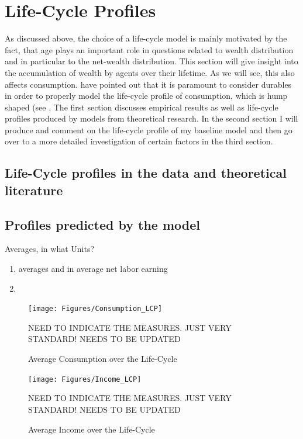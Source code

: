 \documentclass[a4paper,12pt]{article}
\begin{document}
\section{Life-Cycle Profiles}
As discussed above, the choice of a life-cycle model is mainly motivated by the fact, that age plays an important role in questions related to wealth distribution and in particular to the net-wealth distribution. This section will give insight into the accumulation of wealth by agents over their lifetime. As we will see, this also affects consumption. \cite{FV&K2011} have pointed out that it is paramount to consider durables in order to properly model the life-cycle profile of consumption, which is hump shaped (see . The first section discusses empirical results as well as life-cycle profiles produced by models from theoretical research. In the second section I will produce and comment on the life-cycle profile of my baseline model and then go over to a more detailed investigation of certain factors in the third section. 

\subsection{Life-Cycle profiles in the data and theoretical literature}


\subsection{Profiles predicted by the model}
Averages, in what Units?
\begin{enumerate}
\item \cite{hintermaier2016} averages and in average net labor earning
\item 
\end{enumerate}

\begin{figure}
\caption{Average Consumption over the Life-Cycle} 
\label{cash_equivalent_ue_vs_e}	%
\centering
\texttt{[image: Figures/Consumption\_LCP]}  %

\begin{minipage}{0.8\linewidth}
\footnotesize{NEED TO INDICATE THE MEASURES. JUST VERY STANDARD! NEEDS TO BE UPDATED}
\end{minipage}

\end{figure}

\begin{figure}
\caption{Average Income over the Life-Cycle} 
\label{cash_equivalent_ue_vs_e}	%
\centering
\texttt{[image: Figures/Income\_LCP]}  %

\begin{minipage}{0.8\linewidth}
\footnotesize{NEED TO INDICATE THE MEASURES. JUST VERY STANDARD! NEEDS TO BE UPDATED}
\end{minipage}

\end{figure}
\end{document}
